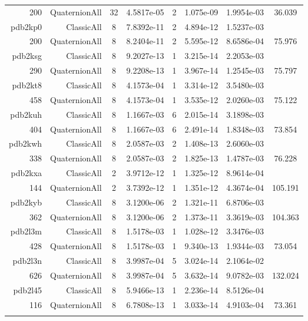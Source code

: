 \begin{xltabular}{\textwidth}{r|rcS[table-format=1.4e+2]cS[table-format=1.3e+2]S[table-format=1.4e+2]S[table-format=-1.3]}
200 & QuaternionAll & 32 & 4.5817e-05 & 2 & 1.075e-09 & 1.9954e-03 & 36.039\\  \addlinespace
pdb2kp0 & ClassicAll & 8 & 7.8392e-11 & 2 & 4.894e-12 & 1.5237e-03 & \\
200 & QuaternionAll & 8 & 8.2404e-11 & 2 & 5.595e-12 & 8.6586e-04 & 75.976\\  \addlinespace
pdb2ksg & ClassicAll & 8 & 9.2027e-13 & 1 & 3.215e-14 & 2.2053e-03 & \\
290 & QuaternionAll & 8 & 9.2208e-13 & 1 & 3.967e-14 & 1.2545e-03 & 75.797\\  \addlinespace
pdb2kt8 & ClassicAll & 8 & 4.1573e-04 & 1 & 3.314e-12 & 3.5480e-03 & \\
458 & QuaternionAll & 8 & 4.1573e-04 & 1 & 3.535e-12 & 2.0260e-03 & 75.122\\  \addlinespace
pdb2kuh & ClassicAll & 8 & 1.1667e-03 & 6 & 2.015e-14 & 3.1898e-03 & \\
404 & QuaternionAll & 8 & 1.1667e-03 & 6 & 2.491e-14 & 1.8348e-03 & 73.854\\  \addlinespace
pdb2kwh & ClassicAll & 8 & 2.0587e-03 & 2 & 1.408e-13 & 2.6060e-03 & \\
338 & QuaternionAll & 8 & 2.0587e-03 & 2 & 1.825e-13 & 1.4787e-03 & 76.228\\  \addlinespace
pdb2kxa & ClassicAll & 2 & 3.9712e-12 & 1 & 1.325e-12 & 8.9614e-04 & \\
144 & QuaternionAll & 2 & 3.7392e-12 & 1 & 1.351e-12 & 4.3674e-04 & 105.191\\  \addlinespace
pdb2kyb & ClassicAll & 8 & 3.1200e-06 & 2 & 1.321e-11 & 6.8706e-03 & \\
362 & QuaternionAll & 8 & 3.1200e-06 & 2 & 1.373e-11 & 3.3619e-03 & 104.363\\  \addlinespace
pdb2l3m & ClassicAll & 8 & 1.5178e-03 & 1 & 1.028e-12 & 3.3476e-03 & \\
428 & QuaternionAll & 8 & 1.5178e-03 & 1 & 9.340e-13 & 1.9344e-03 & 73.054\\  \addlinespace
pdb2l3n & ClassicAll & 8 & 3.9987e-04 & 5 & 3.024e-14 & 2.1064e-02 & \\
626 & QuaternionAll & 8 & 3.9987e-04 & 5 & 3.632e-14 & 9.0782e-03 & 132.024\\  \addlinespace
pdb2l45 & ClassicAll & 8 & 5.9466e-13 & 1 & 2.236e-14 & 8.5126e-04 & \\
116 & QuaternionAll & 8 & 6.7808e-13 & 1 & 3.033e-14 & 4.9103e-04 & 73.361\\  \addlinespace

\end{xltabular}

